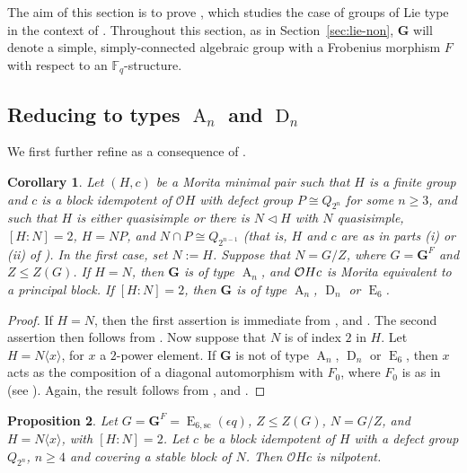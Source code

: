 \documentclass{amsart}
\theoremstyle{plain}\newtheorem{Theorem}{Theorem}[section]
\theoremstyle{plain}\newtheorem{Conjecture}[Theorem]{Conjecture}
\theoremstyle{plain}\newtheorem{Corollary}[Theorem]{Corollary}
\theoremstyle{plain}\newtheorem{Lemma}[Theorem]{Lemma}
\theoremstyle{plain}\newtheorem{Proposition}[Theorem]{Proposition}
\theoremstyle{definition}\newtheorem{Definition}[Theorem]{Definition}
\theoremstyle{definition}\newtheorem{Example}[Theorem]{Example}
\theoremstyle{definition}\newtheorem{Examples}[Theorem]{Examples}
\theoremstyle{definition}\newtheorem{Exercise}[Theorem]{Exercise}
\theoremstyle{definition}\newtheorem{Notation}[Theorem]{Notation}
\theoremstyle{definition}\newtheorem{Remark}[Theorem]{Remark}
\theoremstyle{definition}\newtheorem{Remarks}[Theorem]{Remarks}
\def\CO{{\mathcal{O}}}    \def\OPE{{\mathcal{O}(P\rtimes E)}}
\newcommand{\bG}{{\mathbf{G}}}
\newcommand{\type}{\operatorname}
\numberwithin{equation}{section}
\begin{document}
The  aim of this section is to prove , which studies the case of  groups of Lie type in the context of .  Throughout this section,  as in Section~\ref {sec:lie-non}, $\bG$ will denote a  simple, simply-connected algebraic group with a Frobenius morphism $F$  with respect to an ${\mathbb F}_q$-structure.

\subsection{Reducing to types $\type{A}_n$ and $\type{D}_n$}
We first further refine  as a consequence of .
 \begin{Corollary}   Let $(H,c)$ be a Morita minimal pair such that $H$ is a finite group and $c$ is a block idempotent of $\CO  H$ with defect group $P \cong Q_{2^n}$ for some $n \geq 3$, and such that $H$ is either quasisimple or there is $N\lhd H$ with $N$ quasisimple, $[H:N]=2$, $H=NP$, and $N\cap P\cong Q_{2^{n-1}}$ (that is, $H$ and  $c$ are as in parts (i) or (ii)  of 
). In the first case,  set  $ N:=H$.  Suppose that  $N= G/Z$, where $G=\bG^F$  and $Z \leq  Z(G)$.
If $H=N$,  then  $\bG$ is of type $\type{A}_n$, and  ${\mathcal{O}H} c $ is Morita equivalent to a principal block.  If   $ [H:N]=2 $,  then  $\bG$ is  of type $\type{A}_n$, $\type{D}_n$ or $\type{E}_6$.
\end{Corollary}
\begin{proof} If  $H=N$, then  the first  assertion  is immediate from  ,   and . The second assertion then follows from  .
Now suppose that    $N$ is of index $2$ in $H$. Let  $H=N \langle  x \rangle $,  for  $x$ a  $2$-power element.   If $\bG$ is  not of type  $\type{A}_n$, $\type{D}_n$ or $\type{E}_6$,  then  $x$  acts   as the composition  of a diagonal automorphism  with $F_0$, where  $F_0$ is as in  (see \cite[Thms.~2.5.1,~2.5.12]{GLS3}).  Again, the result follows  from ,   and .
 \end{proof}


\begin{Proposition}   Let $G= \bG^F =  \type{E}_{6,\mathrm{sc}}(\epsilon q) $,   $Z \leq  Z(G)$, $ N= G/Z$, and  $H=N\langle x\rangle$, with   $[H:N]=2$.  
Let $c$  be a  block  idempotent  of    $H$ with  a  defect group $Q_{2^n} $, $ n\geq 4 $  and  covering a  stable block of $N$. Then $\CO Hc$ is nilpotent.
\end{Proposition}
\end{document}
